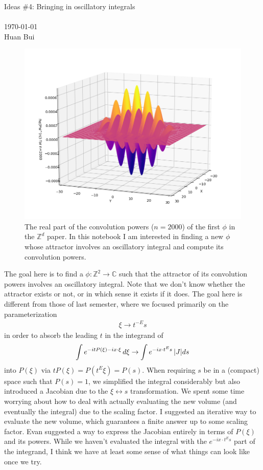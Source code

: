 \documentclass{article}
\theoremstyle{definition}
\newcommand{\C}{\mathbb{C}}
\begin{document}
\begin{center}
	\huge{Ideas \#4: Bringing in oscillatory integrals}\\
	$\,$\\
	\normalsize{\today}\\
	\normalsize{Huan Bui}
\end{center}
\begin{figure}[!htb]
	\centering
	\includegraphics[scale=0.4]{conv_1}
	\caption{The real part of the convolution powers ($n=2000$) of the first $\phi$ in the $\mathbb{Z}^d$ paper. In this notebook I am interested in finding a new $\phi$ whose attractor involves an oscillatory integral and compute its convolution powers.}
\end{figure}


The goal here is to find a $\phi: \mathbb{Z}^2 \to \C$ such that the attractor of its convolution powers involves an oscillatory integral. Note that we don't know whether the attractor exists or not, or in which sense it exists if it does. The goal here is different from those of last semester, where we focused primarily on the parameterization 
\begin{align}
\xi \to t^{-E} s
\end{align} 
in order to absorb the leading $t$ in the integrand of
\begin{align}
\int e^{-itP(\xi) - ix\cdot \xi}\,d\xi \to  \int e^{-ix\cdot t^{E}s}\,\abs{J}ds 
\end{align}
into $P(\xi)$ via $tP(\xi) = P(t^E \xi) = P(s)$. When requiring $s$ be in a (compact) space such that $P(s) = 1$, we simplified the integral considerably but also introduced a Jacobian due to the $\xi \leftrightarrow s$ transformation. We spent some time worrying about how to deal with actually evaluating the new volume (and eventually the integral) due to the scaling factor. I suggested an iterative way to evaluate the new volume, which guarantees a finite answer up to some scaling factor. Evan suggested a way to express the Jacobian entirely in terms of $P(\xi)$ and its powers. While we haven't evaluated the integral with the $e^{-ix\cdot t^Es}$ part of the integrand, I think we have at least some sense of what things can look like once we try. 
\end{document}
